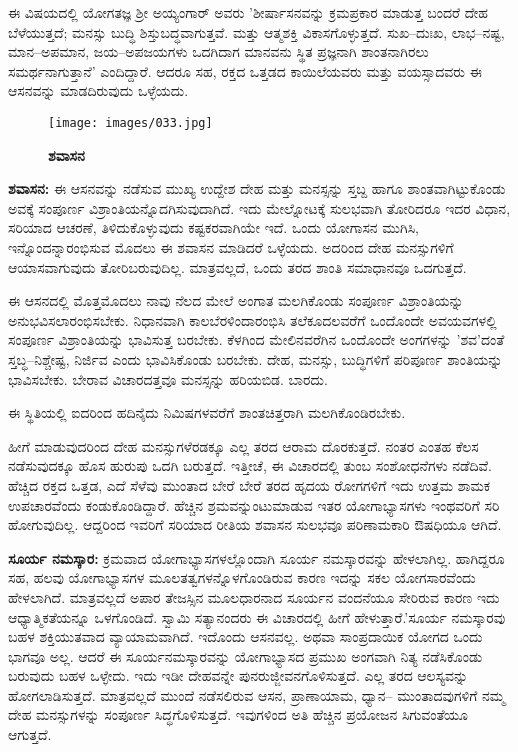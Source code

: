 ಈ ವಿಷಯದಲ್ಲಿ ಯೋಗತಜ್ಞ ಶ‍್ರೀ ಅಯ್ಯಂಗಾರ್ ಅವರು 'ಶೀರ್ಷಾಸನವನ್ನು ಕ್ರಮಪ್ರಕಾರ ಮಾಡುತ್ತ ಬಂದರೆ ದೇಹ ಬೆಳೆಯುತ್ತದೆ; ಮನಸ್ಸು ಬುದ್ಧಿ ಶಿಸ್ತುಬದ್ಧವಾಗುತ್ತವೆ. ಮತ್ತು ಆತ್ಮಶಕ್ತಿ ವಿಕಾಸಗೊಳ್ಳುತ್ತದೆ. ಸುಖ–ದುಃಖ, ಲಾಭ–ನಷ್ಟ, ಮಾನ–ಅಪಮಾನ, ಜಯ–ಅಪಜಯಗಳು ಒದಗಿದಾಗ ಮಾನವನು ಸ್ಥಿತ ಪ್ರಜ್ಞನಾಗಿ ಶಾಂತನಾಗಿರಲು ಸಮರ್ಥನಾಗುತ್ತಾನೆ' ಎಂದಿದ್ದಾರೆ. ಆದರೂ ಸಹ, ರಕ್ತದ ಒತ್ತಡದ ಕಾಯಿಲೆಯವರು ಮತ್ತು ವಯಸ್ಸಾದವರು ಈ ಆಸನವನ್ನು ಮಾಡದಿರುವುದು ಒಳ್ಳೆಯದು.

\begin{figure}
\texttt{[image: images/033.jpg]}
\caption{ \textbf{ಶವಾಸನ} }
\end{figure}

\textbf{  ಶವಾಸನ:} ಈ ಆಸನವನ್ನು ನಡೆಸುವ ಮುಖ್ಯ ಉದ್ದೇಶ ದೇಹ ಮತ್ತು ಮನಸ್ಸನ್ನು ಸ್ತಬ್ದ ಹಾಗೂ ಶಾಂತವಾಗಿಟ್ಟುಕೊಂಡು ಅವಕ್ಕೆ ಸಂಪೂರ್ಣ ವಿಶ್ರಾಂತಿಯನ್ನೊದಗಿಸುವುದಾಗಿದೆ. ಇದು ಮೇಲ್ನೋಟಕ್ಕೆ ಸುಲಭವಾಗಿ ತೋರಿದರೂ ಇದರ ವಿಧಾನ, ಸರಿಯಾದ ಆಚರಣೆ, ತಿಳಿದುಕೊಳ್ಳುವುದು ಕಷ್ಟಕರವಾಗಿಯೇ ಇದೆ. ಒಂದು ಯೋಗಾಸನ ಮುಗಿಸಿ, ಇನ್ನೊಂದನ್ನಾರಂಭಿಸುವ ಮೊದಲು ಈ ಶವಾಸನ ಮಾಡಿದರೆ ಒಳ್ಳೆಯದು. ಅದರಿಂದ ದೇಹ ಮನಸ್ಸುಗಳಿಗೆ ಆಯಾಸವಾಗುವುದು ತೋರಿಬರುವುದಿಲ್ಲ. ಮಾತ್ರವಲ್ಲದೆ, ಒಂದು ತರದ ಶಾಂತಿ ಸಮಾಧಾನವೂ ಒದಗುತ್ತದೆ.

ಈ ಆಸನದಲ್ಲಿ ಮೊತ್ತಮೊದಲು ನಾವು ನೆಲದ ಮೇಲೆ ಅಂಗಾತ ಮಲಗಿಕೊಂಡು ಸಂಪೂರ್ಣ ವಿಶ್ರಾಂತಿಯನ್ನು ಅನುಭವಿಸಲಾರಂಭಿಸಬೇಕು. ನಿಧಾನವಾಗಿ ಕಾಲಬೆರಳಿಂದಾರಂಭಿಸಿ ತಲೆಕೂದಲವರೆಗೆ ಒಂದೊಂದೇ ಅವಯವಗಳಲ್ಲಿ ಸಂಪೂರ್ಣ ವಿಶ್ರಾಂತಿಯನ್ನು ಭಾವಿಸುತ್ತ ಬರಬೇಕು. ಕೆಳಗಿಂದ ಮೇಲಿನವರೆಗಿನ ಒಂದೊಂದೇ ಅಂಗಗಳನ್ನು 'ಶವ'ದಂತೆ ಸ್ತಬ್ಧ–ನಿಶ್ಚೇಷ್ಟ, ನಿರ್ಜಿವ ಎಂದು ಭಾವಿಸಿಕೊಂಡು ಬರಬೇಕು. ದೇಹ, ಮನಸ್ಸು, ಬುದ್ಧಿಗಳಿಗೆ ಪರಿಪೂರ್ಣ ಶಾಂತಿಯನ್ನು ಭಾವಿಸಬೇಕು. ಬೇರಾವ ವಿಚಾರದತ್ತವೂ ಮನಸ್ಸನ್ನು ಹರಿಯಬಿಡ. ಬಾರದು.

ಈ ಸ್ಥಿತಿಯಲ್ಲಿ ಐದರಿಂದ ಹದಿನೈದು ನಿಮಿಷಗಳವರೆಗೆ ಶಾಂತಚಿತ್ತರಾಗಿ ಮಲಗಿಕೊಂಡಿರಬೇಕು.

ಹೀಗೆ ಮಾಡುವುದರಿಂದ ದೇಹ ಮನಸ್ಸುಗಳೆರಡಕ್ಕೂ ಎಲ್ಲ ತರದ ಆರಾಮ ದೊರಕುತ್ತದೆ. ನಂತರ ಎಂತಹ ಕೆಲಸ ನಡೆಸುವುದಕ್ಕೂ ಹೊಸ ಹುರುಪು ಒದಗಿ ಬರುತ್ತದೆ. ಇತ್ತೀಚೆ, ಈ ವಿಚಾರದಲ್ಲಿ ತುಂಬ ಸಂಶೋಧನೆಗಳು ನಡೆದಿವೆ. ಹೆಚ್ಚಿದ ರಕ್ತದ ಒತ್ತಡ, ಎದೆ ಸೆಳೆವು ಮುಂತಾದ ಬೇರೆ ಬೇರೆ ತರದ ಹೃದಯ ರೋಗಗಳಿಗೆ ಇದು ಉತ್ತಮ ಶಾಮಕ ಉಪಚಾರವೆಂದು ಕಂಡುಕೊಂಡಿದ್ದಾರೆ. ಹೆಚ್ಚಿನ ಶ್ರಮವನ್ನುಂಟುಮಾಡುವ ಇತರ ಯೋಗಾಭ್ಯಾಸಗಳು ಇಂಥವರಿಗೆ ಸರಿ ಹೋಗುವುದಿಲ್ಲ. ಆದ್ದರಿಂದ ಇವರಿಗೆ ಸರಿಯಾದ ರೀತಿಯ ಶವಾಸನ ಸುಲಭವೂ ಪರಿಣಾಮಕಾರಿ ಔಷಧಿಯೂ ಆಗಿದೆ.

\textbf{  ಸೂರ್ಯ ನಮಸ್ಕಾರ:} ಕ್ರಮವಾದ ಯೋಗಾಭ್ಯಾಸಗಳಲ್ಲೊಂದಾಗಿ ಸೂರ್ಯ ನಮಸ್ಕಾರವನ್ನು ಹೇಳಲಾಗಿಲ್ಲ. ಹಾಗಿದ್ದರೂ ಸಹ, ಹಲವು ಯೋಗಾಭ್ಯಾಸಗಳ ಮೂಲತತ್ವಗಳನ್ನೊಳಗೊಂಡಿರುವ ಕಾರಣ ಇದನ್ನು ಸಕಲ ಯೋಗಸಾರವೆಂದು ಹೇಳಲಾಗಿದೆ. ಮಾತ್ರವಲ್ಲದೆ ಅಪಾರ ತೇಜಸ್ಸಿನ ಮೂಲಧಾರನಾದ ಸೂರ್ಯನ ವಂದನೆಯೂ ಸೇರಿರುವ ಕಾರಣ ಇದು ಆಧ್ಯಾತ್ಮಿಕತೆಯನ್ನೂ ಒಳಗೊಂಡಿದೆ. ಸ್ವಾಮಿ ಸತ್ಯಾನಂದರು ಈ ವಿಚಾರದಲ್ಲಿ ಹೀಗೆ ಹೇಳುತ್ತಾರೆ.'ಸೂರ್ಯ ನಮಸ್ಕಾರವು ಬಹಳ ಶಕ್ತಿಯುತವಾದ ವ್ಯಾಯಾಮವಾಗಿದೆ. ಇದೊಂದು ಆಸನವಲ್ಲ. ಅಥವಾ ಸಾಂಪ್ರದಾಯಿಕ ಯೋಗದ ಒಂದು ಭಾಗವೂ ಅಲ್ಲ. ಆದರೆ ಈ ಸೂರ್ಯನಮಸ್ಕಾರವನ್ನು ಯೋಗಾಭ್ಯಾಸದ ಪ್ರಮುಖ ಅಂಗವಾಗಿ ನಿತ್ಯ ನಡೆಸಿಕೊಂಡು ಬರುವುದು ಬಹಳ ಒಳ್ಳೇದು. ಇದು ಇಡೀ ದೇಹವನ್ನೇ ಪುನರುಜ್ಜೀವನಗೊಳಿಸುತ್ತದೆ. ಎಲ್ಲ ತರದ ಆಲಸ್ಯವನ್ನು ಹೋಗಲಾಡಿಸುತ್ತದೆ. ಮಾತ್ರವಲ್ಲದೆ ಮುಂದೆ ನಡೆಸಲಿರುವ ಆಸನ, ಪ್ರಾಣಾಯಾಮ, ಧ್ಯಾನ– ಮುಂತಾದವುಗಳಿಗೆ ನಮ್ಮ ದೇಹ ಮನಸ್ಸುಗಳನ್ನು ಸಂಪೂರ್ಣ ಸಿದ್ಧಗೊಳಿಸುತ್ತದೆ. ಇವುಗಳಿಂದ ಅತಿ ಹೆಚ್ಚಿನ ಪ್ರಯೋಜನ ಸಿಗುವಂತೆಯೂ ಆಗುತ್ತದೆ.


